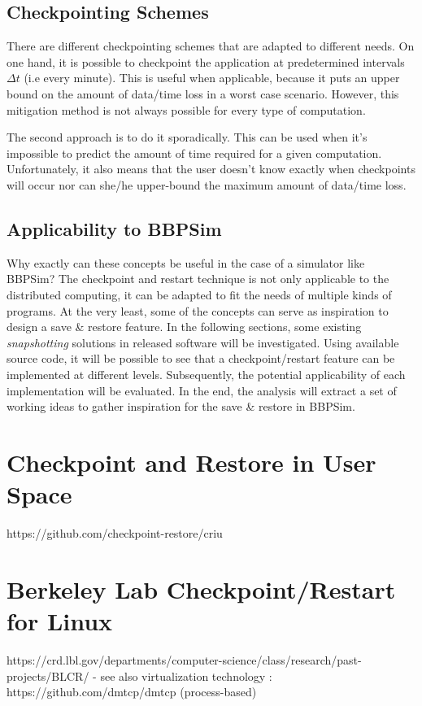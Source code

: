 {\subsection*{Checkpointing Schemes}
There are different checkpointing schemes that are adapted to different needs. On one hand, it is possible to checkpoint the application at predetermined intervals $\Delta t$ (i.e every minute). This is useful when applicable, because it puts an upper bound on the amount of data/time loss in a worst case scenario. However, this mitigation method is not always possible for every type of computation. 

The second approach is to do it sporadically. This can be used when it's impossible to predict the amount of time required for a given computation. Unfortunately, it also means that the user doesn't know exactly when checkpoints will occur nor can she/he upper-bound the maximum amount of data/time loss.

\subsection*{Applicability to BBPSim}
Why exactly can these concepts be useful in the case of a simulator like BBPSim? The checkpoint and restart technique is not only applicable to the distributed computing, it can be adapted to fit the needs of multiple kinds of programs. At the very least, some of the concepts can serve as inspiration to design a save \& restore feature. In the following sections, some existing \textit{snapshotting} solutions in released software will be investigated. Using available source code, it will be possible to see that a checkpoint/restart feature can be implemented at different levels. Subsequently, the potential applicability of each implementation will be evaluated. In the end, the analysis will extract a set of working ideas to gather inspiration for the save \& restore in BBPSim.


  

\section{Checkpoint and Restore in User Space}\label{sec:criu}
https://github.com/checkpoint-restore/criu
\section{Berkeley Lab Checkpoint/Restart for Linux}\label{sec:blcr}
https://crd.lbl.gov/departments/computer-science/class/research/past-projects/BLCR/
- see also virtualization technology : https://github.com/dmtcp/dmtcp (process-based)



}